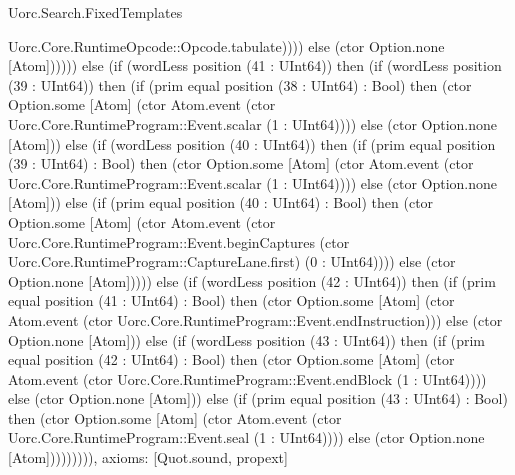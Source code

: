 \begin{lexlean}{Uorc.Search.FixedTemplates}
\begin{semanticmodule}
{Uorc.Core.RuntimeOpcode::Opcode.tabulate)))) else (ctor Option.none [Atom]))))) else (if (wordLess position (41 : UInt64)) then (if (wordLess position (39 : UInt64)) then (if (prim equal position (38 : UInt64) : Bool) then (ctor Option.some [Atom] (ctor Atom.event (ctor Uorc.Core.RuntimeProgram::Event.scalar (1 : UInt64)))) else (ctor Option.none [Atom])) else (if (wordLess position (40 : UInt64)) then (if (prim equal position (39 : UInt64) : Bool) then (ctor Option.some [Atom] (ctor Atom.event (ctor Uorc.Core.RuntimeProgram::Event.scalar (1 : UInt64)))) else (ctor Option.none [Atom])) else (if (prim equal position (40 : UInt64) : Bool) then (ctor Option.some [Atom] (ctor Atom.event (ctor Uorc.Core.RuntimeProgram::Event.beginCaptures (ctor Uorc.Core.RuntimeProgram::CaptureLane.first) (0 : UInt64)))) else (ctor Option.none [Atom])))) else (if (wordLess position (42 : UInt64)) then (if (prim equal position (41 : UInt64) : Bool) then (ctor Option.some [Atom] (ctor Atom.event (ctor Uorc.Core.RuntimeProgram::Event.endInstruction))) else (ctor Option.none [Atom])) else (if (wordLess position (43 : UInt64)) then (if (prim equal position (42 : UInt64) : Bool) then (ctor Option.some [Atom] (ctor Atom.event (ctor Uorc.Core.RuntimeProgram::Event.endBlock (1 : UInt64)))) else (ctor Option.none [Atom])) else (if (prim equal position (43 : UInt64) : Bool) then (ctor Option.some [Atom] (ctor Atom.event (ctor Uorc.Core.RuntimeProgram::Event.seal (1 : UInt64)))) else (ctor Option.none [Atom])))))))),
  axioms: [Quot.sound, propext]
}


\end{semanticmodule}
\end{lexlean}
